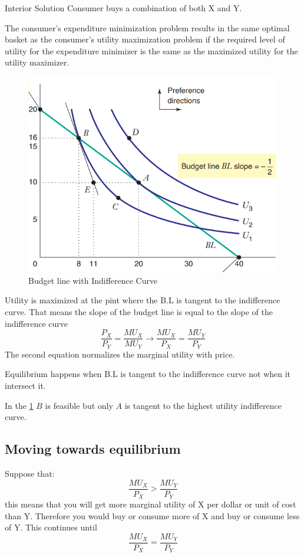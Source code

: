 \documentclass[../ECON-281-Notes.tex]{subfiles}
\begin{document}
\begin{Definition}
    {Interior Solution}
    Consumer buys a combination of both X and Y.
\end{Definition}

The consumer's expenditure minimization problem results in the same optimal basket as the consumer's utility maximization problem if the required level of utility for the expenditure minimizer is the same as the maximized utility for the utility maximizer.

\begin{figure}[htbp]
    \centering
    \includegraphics[width=0.8\columnwidth]{../assets/BL-indiff-curve.png}
    \caption{Budget line with Indifference Curve}
    \label{fig:BL_ind_curve}
\end{figure}
Utility is maximized at the pint where the B.L is tangent to the indifference curve. 
That means the slope of the budget line is equal to the slope of the indifference curve 
\[
    \frac{P_X}{P_Y} = \frac{MU_X}{MU_Y} \rightarrow \frac{MU_X}{P_X} = \frac{MU_Y}{P_Y}
\]
The second equation normalizes the marginal utility with price.

Equilibrium happens when B.L is tangent to the indifference curve not when it intersect it.

In the \cref{fig:BL_ind_curve} \(B\) is feasible but only \(A\) is tangent to the highest utility indifference curve.

\subsection{Moving towards equilibrium}
Suppose that:
\[\frac{MU_X}{P_X} > \frac{MU_Y}{P_Y}\]
this means that you will get more marginal utility of X per dollar or unit of cost than Y. Therefore you would buy or consume more of X and buy or consume less of Y. This continues until
\[\frac{MU_X}{P_X} = \frac{MU_Y}{P_Y}\]
\end{document}

